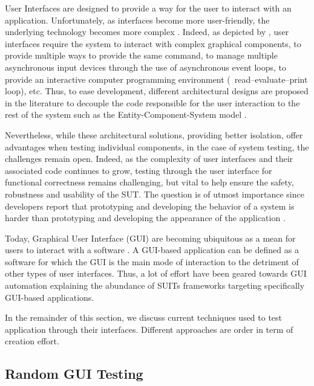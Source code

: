 User Interfaces are designed to provide a way for the user to interact with an application. Unfortunately, as interfaces become more user-friendly, the underlying technology becomes more complex \cite{Myers1994}. Indeed, as depicted by \citep{Myers1995}, user interfaces require the system to  interact with complex graphical components, to provide multiple ways to provide the same command, to manage multiple asynchronous input devices through the use of asynchronous event loops, to provide an interactive computer programming environment (\eg\ read–evaluate–print loop), etc. Thus, to ease development, different architectural designs are proposed in the literature to decouple the code responsible for the user interaction to the rest of the system such as the Entity-Component-System model \cite{Raffaillac2018}.

Nevertheless, while these architectural solutions, providing better isolation, offer advantages when testing individual components, in the case of system testing, the challenges remain open. Indeed, as the complexity of user interfaces and their associated code continues to grow, testing through the user interface for functional correctness remains challenging, but vital to help ensure the safety, robustness and usability of the SUT. The question is of utmost importance since developers report that prototyping and developing the behavior of a system is harder than prototyping and developing the appearance of the application \cite{Myers2008}.

Today, Graphical User Interface (GUI) are becoming ubiquitous as a mean for users to interact with a software \cite{Myers1992, Myers1995, Brooks2009}. A GUI-based application can be defined as a software for which the GUI is the main mode of interaction to the detriment of other types of user interfaces. Thus, a lot of effort have been geared towards GUI automation explaining the abundance of SUITs frameworks targeting specifically GUI-based applications.


In the remainder of this section, we discuss current techniques used to test application through their interfaces. Different approaches are order in term of creation effort.

\subsection{Random GUI Testing}
\label{sec:introduction-random-gui-testing}

